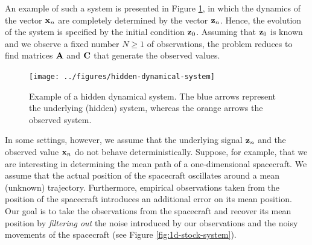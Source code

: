\documentclass[12pt, oneside]{book}
\numberwithin{equation}{section}
\newcommand{\x}{{\bf x}}
\newcommand{\z}{{\bf z}}
\begin{document}
An example of such a system is presented in Figure \ref{fig:hidden-dynamical-system}, in which the dynamics of the vector $\x_n$ are completely determined by the vector $\z_n$. Hence, the evolution of the system is specified by the initial condition $\z_0$. Assuming that $\z_0$ is known and we observe a fixed number $N \geq 1$ of observations, the problem reduces to find matrices ${\bf A}$ and ${\bf C}$ that generate the observed values.

\begin{figure}[h!]
	\centering
	\texttt{[image: ../figures/hidden-dynamical-system]}
	\caption{Example of a hidden dynamical system. The blue arrows represent the underlying (hidden) system, whereas the orange arrows the observed system.}
	\label{fig:hidden-dynamical-system}
\end{figure}

In some settings, however, we assume that the underlying signal $\z_n$ and the observed value $\x_n$ do not behave deterministically. Suppose, for example, that we are interesting in determining the mean path of a one-dimensional spacecraft. We assume that the actual position of the spacecraft oscillates around a mean (unknown) trajectory. Furthermore, empirical observations taken from the position of the spacecraft introduces an additional error on its mean position. Our goal is to take the observations from the spacecraft and recover its mean position by \textit{filtering out} the noise introduced by our observations and the noisy movements of the spacecraft (see Figure \ref{fig:1d-stock-system}).
\end{document}
